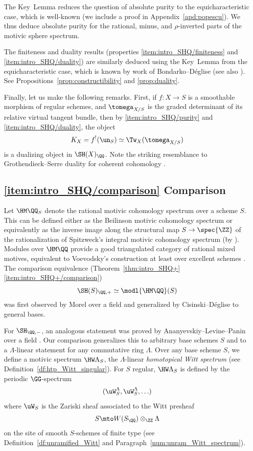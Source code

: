 The Key~Lemma reduces the question of absolute purity to the equicharacteristic case, which is well-known (we include a proof in Appendix~\ref{apd:popescu}).
We thus deduce absolute purity for the rational, minus, and $\rho$-inverted parts of the motivic sphere spectrum.

The finiteness and duality results (properties \eqref{item:intro_SHQ/finiteness} and \eqref{item:intro_SHQ/duality}) are similarly deduced using the Key~Lemma from the equicharacteristic case, which is known by work of Bondarko--Déglise \cite{BD1} (see also \cite[\S3.1]{ElmantoKhan}).
See Propositions~\ref{prop:constructibility} and \ref{prop:duality}.

Finally, let us make the following remarks.
First, if $f : X \to S$ is a smoothable morphism of regular schemes, and $\tomega_{X/S}$ is the graded determinant of its relative virtual tangent bundle, then by \eqref{item:intro_SHQ/purity} and \eqref{item:intro_SHQ/duality}, the object
\[
K_X = f^!(\un_S) \simeq \Tw_X(\tomega_{X/S})
\]
is a dualizing object in $\SH(X)_\QQ$.
Note the striking resemblance to Grothendieck--Serre duality for coherent cohomology \cite[Def.\,III.2, Prop.\,7.2]{HartshorneRD}.

\subsection*{\eqref{item:intro_SHQ/comparison} Comparison}

Let $\HM\QQ_S$ denote the rational motivic cohomology spectrum over a scheme $S$.
This can be defined either as the Beilinson motivic cohomology spectrum \cite[Def.\,14.1.2]{CD3} or equivalently as the inverse image along the structural map $S \to \spec{\ZZ}$ of the rationalization of Spitzweck's integral motivic cohomology spectrum (by \cite[Th.\,7.14]{SpitzweckSpectrum}).
Modules over $\HM\QQ$ provide a good triangulated category of rational mixed motives, equivalent to Voevodsky's construction at least over excellent schemes \cite[\S16.1]{CD3}.
The comparison equivalence (Theorem~\ref{thm:intro_SHQ+}\eqref{item:intro_SHQ+/comparison})
\[
\SH(S)_{\QQ,+} \simeq \modl{\HM\QQ}(S)
\]
was first observed by Morel over a field \cite{MorelSplitting} and generalized by Cisinski--Déglise \cite[\S 16.2]{CD3} to general bases.

For $\SH_{\QQ,-}$, an analogous statement was proved by Ananyevskiy--Levine--Panin over a field \cite[\S 4]{ALP}.
Our comparison generalizes this to arbitrary base schemes $S$ and to a $\Lambda$-linear statement for any commutative ring $\Lambda$.
Over any base scheme $S$, we define a motivic spectrum $\HW \Lambda_S$, the $\Lambda$-linear \emph{homotopical Witt spectrum} (see Definition~\ref{df:htp_Witt_singular}).
For $S$ regular, $\HW \Lambda_S$ is defined by the periodic $\GG$-spectrum
\[
(\uW_S^\Lambda,\uW_S^\Lambda,\hdots)
\]
where $\uW_S$ is the Zariski sheaf associated to the Witt presheaf
\[
S \mto W(S_\QQ) \otimes_\ZZ \Lambda
\]
on the site of smooth $S$-schemes of finite type (see Definition~\ref{df:unramified_Witt} and Paragraph~\ref{num:unram_Witt_spectrum}).

